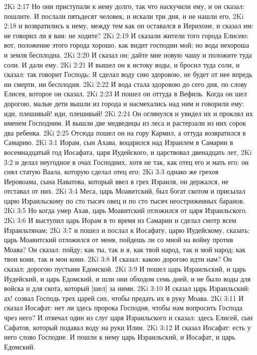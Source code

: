 2Ki 2:17  Но они приступали к нему долго, так что наскучили ему, и он сказал: пошлите. И послали пятьдесят человек, и искали три дня, и не нашли его,
2Ki 2:18  и возвратились к нему, между тем как он оставался в Иерихоне, и сказал им: не говорил ли я вам: не ходите?
2Ki 2:19  И сказали жители того города Елисею: вот, положение этого города хорошо, как видит господин мой; но вода нехороша и земля бесплодна.
2Ki 2:20  И сказал он: дайте мне новую чашу и положите туда соли. И дали ему.
2Ki 2:21  И вышел он к истоку воды, и бросил туда соли, и сказал: так говорит Господь: Я сделал воду сию здоровою, не будет от нее впредь ни смерти, ни бесплодия.
2Ki 2:22  И вода стала здоровою до сего дня, по слову Елисея, которое он сказал.
2Ki 2:23  И пошел он оттуда в Вефиль. Когда он шел дорогою, малые дети вышли из города и насмехались над ним и говорили ему: иди, плешивый! иди, плешивый!
2Ki 2:24  Он оглянулся и увидел их и проклял их именем Господним. И вышли две медведицы из леса и растерзали из них сорок два ребенка.
2Ki 2:25  Отсюда пошел он на гору Кармил, а оттуда возвратился в Самарию.
2Ki 3:1  Иорам, сын Ахава, воцарился над Израилем в Самарии в восемнадцатый год Иосафата, царя Иудейского, и царствовал двенадцать лет,
2Ki 3:2  и делал неугодное в очах Господних, хотя не так, как отец его и мать его: он снял статую Ваала, которую сделал отец его;
2Ki 3:3  однако же грехов Иеровоама, сына Наватова, который ввел в грех Израиля, он держался, не отставал от них.
2Ki 3:4  Меса, царь Моавитский, был богат скотом и присылал царю Израильскому по сто тысяч овец и по сто тысяч неостриженных баранов.
2Ki 3:5  Но когда умер Ахав, царь Моавитский отложился от царя Израильского.
2Ki 3:6  И выступил царь Иорам в то время из Самарии и сделал смотр всем Израильтянам;
2Ki 3:7  и пошел и послал к Иосафату, царю Иудейскому, сказать: царь Моавитский отложился от меня, пойдешь ли со мной на войну против Моава? Он сказал: пойду; как ты, так и я, как твой народ, так и мой народ; как твои кони, так и мои кони.
2Ki 3:8  И сказал: какою дорогою идти нам? Он сказал: дорогою пустыни Едомской.
2Ki 3:9  И пошел царь Израильский, и царь Иудейский, и царь Едомский, и шли они обходом семь дней, и не было воды для войска и для скота, который [шел] за ними.
2Ki 3:10  И сказал царь Израильский: ах! созвал Господь трех царей сих, чтобы предать их в руку Моава.
2Ki 3:11  И сказал Иосафат: нет ли здесь пророка Господня, чтобы нам вопросить Господа чрез него? И отвечал один из слуг царя Израильского и сказал: здесь Елисей, сын Сафатов, который подавал воду на руки Илии.
2Ki 3:12  И сказал Иосафат: есть у него слово Господне. И пошли к нему царь Израильский, и Иосафат, и царь Едомский.
